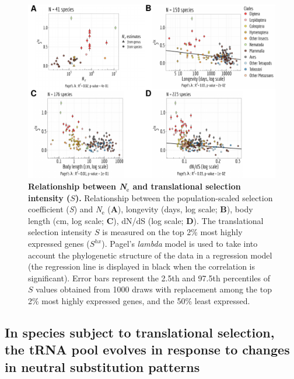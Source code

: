 \begin{figure}[t]   
    \begin{center}
        \includegraphics[width=\textwidth]{Figure7.pdf}
    \end{center}                                                                       
    \caption[Relationship between \textit{N}$_{\text{e}}$ and translational selection intensity ($S$)]{\textbf{Relationship between \textit{N}$_{\text{e}}$ and translational selection intensity ($S$).} 
    Relationship between the population-scaled selection coefficient (\textit{S}) and \textit{N}$_{\text{e}}$ (\textbf{A}), longevity (days, log scale; \textbf{B}), body length (cm, log scale; \textbf{C}), dN/dS (log scale; \textbf{D}). The translational selection intensity $S$ is measured on the top 2\% most highly expressed genes ($S^{hx}$). Pagel's \textit{lambda} model is used to take into account the phylogenetic structure of the data in a regression model (the regression line is displayed in black when the correlation is significant). Error bars represent the 2.5th and 97.5th percentiles of $S$ values obtained from 1000 draws with replacement among the top 2\% most highly expressed genes, and the 50\% least expressed.
    }
    \label{fig:CU7}
\end{figure}


\subsection{In species subject to translational selection, the tRNA pool evolves in response to changes in neutral substitution patterns}

